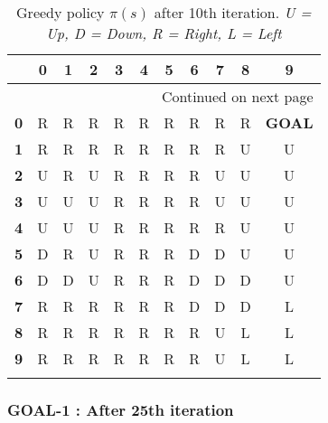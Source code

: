 \documentclass{article}
\begin{document}
\begin{longtable}{|c|c|c|c|c|c|c|c|c|c|c|}
\toprule
{} &  0 &  1 &  2 &  3 &  4 &  5 &  6 &  7 &  8 &  9 \\
\midrule
\endhead
\midrule
\multicolumn{11}{r}{{Continued on next page}} \\
\midrule
\endfoot

\bottomrule
\endlastfoot
\textbf{0} &  R &  R &  R &  R &  R &  R &  R &  R &  R &  \textbf{GOAL}\\\hline
\textbf{1} &  R &  R &  R &  R &  R &  R &  R &  R &  U &  U \\\hline
\textbf{2} &  U &  R &  U &  R &  R &  R &  R &  U &  U &  U \\\hline
\textbf{3} &  U &  U &  U &  R &  R &  R &  R &  U &  U &  U \\\hline
\textbf{4} &  U &  U &  U &  R &  R &  R &  R &  R &  U &  U \\\hline
\textbf{5} &  D &  R &  U &  R &  R &  R &  D &  D &  U &  U \\\hline
\textbf{6} &  D &  D &  U &  R &  R &  R &  D &  D &  D &  U \\\hline
\textbf{7} &  R &  R &  R &  R &  R &  R &  D &  D &  D &  L \\\hline
\textbf{8} &  R &  R &  R &  R &  R &  R &  R &  U &  L &  L \\\hline
\textbf{9} &  R &  R &  R &  R &  R &  R &  R &  U &  L &  L \\\hline
\caption{Greedy policy $\pi(s)$ after 10th iteration. \textit{U = Up, D = Down, R = Right, L = Left}}
\end{longtable}

\clearpage

\subsubsection*{GOAL-1 : After 25th iteration}
\end{document}
